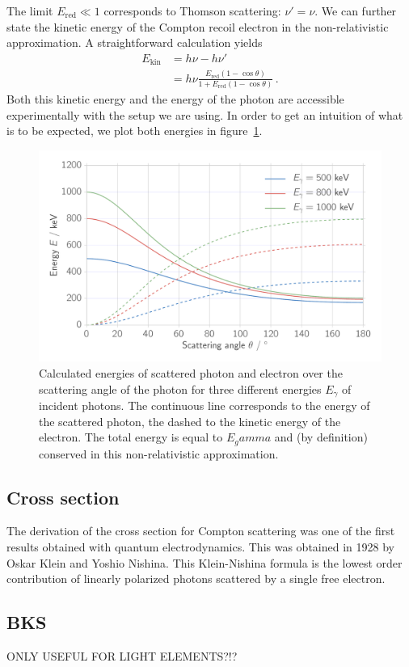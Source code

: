The limit $E_\text{red} \ll 1$ corresponds to Thomson scattering: $\nu' = \nu$. 
We can further state the kinetic energy of the Compton recoil electron in the non-relativistic approximation. A 
straightforward calculation yields\cite{siegbahn2012alpha} 
\begin{equation}
    \begin{split}
        E_\text{kin} &= h\nu - h\nu' \\
                     &=  h\nu \frac{E_\text{red} (1 - \cos\theta)}{1 + E_\text{red}(1 - \cos\theta)} \, .
        \label{eq:ekin}
    \end{split}
\end{equation}
Both this kinetic energy and the energy of the photon are accessible experimentally with the setup we are using. 
In order to get an intuition of what is to be expected, we plot both energies in figure~\ref{fig:theory_conservation}.

\begin{figure}[htpb]
    \centering
    \includegraphics[width=0.8\linewidth]{analysis/figures/theory_conservation}
    \caption{
        Calculated energies of scattered photon and electron over the scattering angle of the photon for three different
        energies $E_\gamma$ of incident photons.
        The continuous line corresponds to the energy of the scattered photon, the dashed to the kinetic energy of the
        electron. The total energy is equal to $E_gamma$ and (by definition) conserved in this non-relativistic 
        approximation. 
        }
    \label{fig:theory_conservation}
\end{figure}



\subsection{Cross section}
\label{sec:cross_section}
The derivation of the cross section for Compton scattering was one of the first results obtained with quantum 
electrodynamics. This was obtained in 1928 by Oskar Klein and Yoshio Nishina. This Klein-Nishina formula is the lowest 
order contribution of linearly polarized photons scattered by a single free electron. 

\subsection{BKS}
\label{sec:BKS}


ONLY USEFUL FOR LIGHT ELEMENTS?!?
